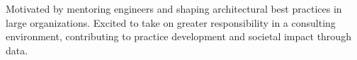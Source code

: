 

\begin{cvparagraph}

Motivated by mentoring engineers and shaping architectural best practices in large organizations. Excited to take on greater responsibility in a consulting environment, contributing to practice development and societal impact through data.

\end{cvparagraph}
